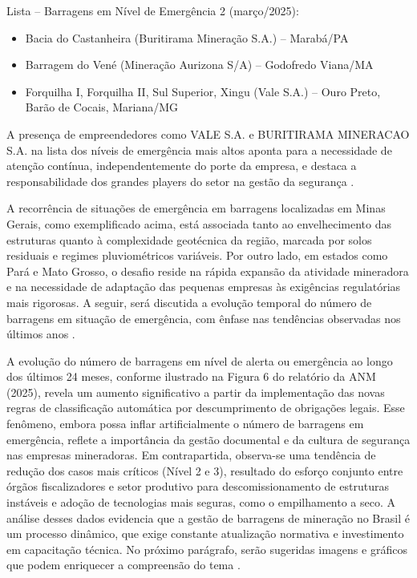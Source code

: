 Lista – Barragens em Nível de Emergência 2 (março/2025):
\begin{itemize}
    \item Bacia do Castanheira (Buritirama Mineração S.A.) – Marabá/PA
    \item Barragem do Vené (Mineração Aurizona S/A) – Godofredo Viana/MA
    \item Forquilha I, Forquilha II, Sul Superior, Xingu (Vale S.A.) – Ouro Preto, Barão de Cocais, Mariana/MG
\end{itemize}

A presença de empreendedores como VALE S.A. e BURITIRAMA MINERACAO S.A. na lista dos níveis de emergência mais altos aponta para a necessidade de atenção contínua, independentemente do porte da empresa, e destaca a responsabilidade dos grandes players do setor na gestão da segurança \cite{anm2025boletim}.

A recorrência de situações de emergência em barragens localizadas em Minas Gerais, como exemplificado acima, está associada tanto ao envelhecimento das estruturas quanto à complexidade geotécnica da região, marcada por solos residuais e regimes pluviométricos variáveis. Por outro lado, em estados como Pará e Mato Grosso, o desafio reside na rápida expansão da atividade mineradora e na necessidade de adaptação das pequenas empresas às exigências regulatórias mais rigorosas. A seguir, será discutida a evolução temporal do número de barragens em situação de emergência, com ênfase nas tendências observadas nos últimos anos \cite{anm2025boletim}.

A evolução do número de barragens em nível de alerta ou emergência ao longo dos últimos 24 meses, conforme ilustrado na Figura 6 do relatório da ANM (2025), revela um aumento significativo a partir da implementação das novas regras de classificação automática por descumprimento de obrigações legais. Esse fenômeno, embora possa inflar artificialmente o número de barragens em emergência, reflete a importância da gestão documental e da cultura de segurança nas empresas mineradoras. Em contrapartida, observa-se uma tendência de redução dos casos mais críticos (Nível 2 e 3), resultado do esforço conjunto entre órgãos fiscalizadores e setor produtivo para descomissionamento de estruturas instáveis e adoção de tecnologias mais seguras, como o empilhamento a seco. A análise desses dados evidencia que a gestão de barragens de mineração no Brasil é um processo dinâmico, que exige constante atualização normativa e investimento em capacitação técnica. No próximo parágrafo, serão sugeridas imagens e gráficos que podem enriquecer a compreensão do tema \cite{anm2025boletim}.

